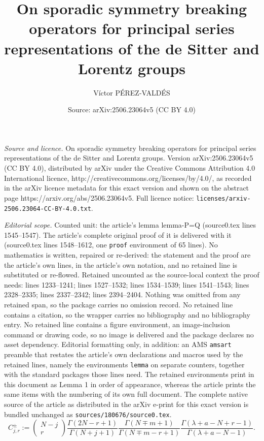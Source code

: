 \documentclass[10pt,a4paper]{amsart}
\title{On sporadic symmetry breaking operators for principal series representations of the de Sitter and Lorentz groups}
\author{V\'{i}ctor P\'{E}REZ-VALD\'{E}S}
\date{Source: arXiv:2506.23064v5 (CC BY 4.0)}
\begin{document}
\maketitle

\noindent\emph{Source and licence.} On sporadic symmetry breaking operators for principal series representations of the de Sitter and Lorentz groups. Version arXiv:2506.23064v5 (CC BY 4.0), distributed by arXiv under the Creative Commons Attribution 4.0 International licence, http://creativecommons.org/licenses/by/4.0/, as recorded in the arXiv licence metadata for this exact version and shown on the abstract page https://arxiv.org/abs/2506.23064v5. Full licence notice: \texttt{licenses/arxiv-2506.23064-CC-BY-4.0.txt}.\par\smallskip

\noindent\textit{Editorial scope.} Counted unit: the article's lemma lemma-P=Q (source0.tex lines 1545--1547). The article's complete original proof of it is delivered with it (source0.tex lines 1548--1612, one \texttt{proof} environment of 65 lines). No mathematics is written, repaired or re-derived: the statement and the proof are the article's own lines, in the article's own notation, and no retained line is substituted or re-flowed.  Retained uncounted as the source-local context the proof needs: lines 1233--1241; lines 1527--1532; lines 1534--1539; lines 1541--1543; lines 2328--2335; lines 2337--2342; lines 2394--2404.  Nothing was omitted from any retained span, so the package carries no omission record.  No retained line contains a citation, so the wrapper carries no bibliography and no bibliography entry.  No retained line contains a figure environment, an image-inclusion command or drawing code, so no image is delivered and the package declares no asset dependency.  Editorial formatting only, in addition: an AMS \texttt{amsart} preamble that restates the article's own declarations and macros used by the retained lines, namely the environments \texttt{lemma} on separate counters, together with the standard packages those lines need.  The retained environments print in this document as Lemma 1 in order of appearance, whereas the article prints the same items with the numbering of its own full document.  The complete native source of the article as distributed in the arXiv e-print for this exact version is bundled unchanged as \texttt{sources/180676/source0.tex}.
\begin{equation}\label{definition-constants-Cjr+-}
C_{j, r}^\pm := \begin{pmatrix}
N-j\\
r
\end{pmatrix}
\frac{\Gamma(2N-r+1)}{\Gamma(N+j+1)}
\frac{\Gamma(N\mp m+1)}{\Gamma(N\mp m -r +1)}
\frac{\Gamma(\lambda+a-N+r-1)}{\Gamma(\lambda+a-N-1)}.
\end{equation}
\end{document}

